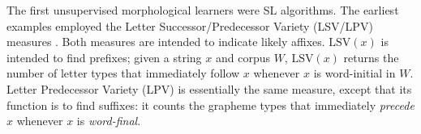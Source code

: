 The first unsupervised morphological learners were SL algorithms. The earliest examples employed the 
Letter Successor/Predecessor Variety (LSV/LPV) measures \citep{harris:1955, harris:1967}. 
Both measures are intended to indicate likely affixes.
$\text{LSV}(x)$ is intended to find prefixes; given a string $x$ and corpus $W$, 
$\text{LSV}(x)$ returns the number of letter types that immediately follow $x$ whenever $x$ is word-initial in $W$.
Letter Predecessor Variety (LPV) is essentially the same measure, except that its function is to find suffixes:
it counts the grapheme types that immediately \emph{precede} $x$ whenever $x$ is \emph{word-final}.


%

